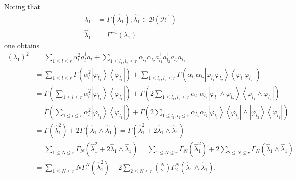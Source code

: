 \documentclass[aps,preprint]{revtex4}%
\begin{document}
Noting that
\begin{align}
\lambda_{1}  &  =\Gamma\left(  \hat{\lambda}_{1}\right)  ;\hat{\lambda}_{1}%
\in\mathcal{B}\left(  \mathcal{H}^{1}\right) \nonumber\\
\hat{\lambda}_{1}  &  =\Gamma^{-1}\left(  \lambda_{1}\right)
\end{align}
one obtains%
\begin{align}
\left(  \lambda_{1}\right)  ^{2}  &  =\sum_{1\leq l\leq r}\alpha_{l}^{2}%
a_{l}^{\dagger}a_{l}+\sum_{1\leq l_{1},l_{2}\leq r}\alpha_{l_{1}}\alpha
_{l_{2}}a_{l_{1}}^{\dagger}a_{l_{2}}^{\dagger}a_{l_{2}}a_{l_{1}}\nonumber\\
&  =\sum_{1\leq l\leq r}\Gamma\left(  \alpha_{l}^{2}\left\vert \varphi_{l_{1}%
}\right\rangle \left\langle \varphi_{l_{1}}\right\vert \right)  +\sum_{1\leq
l_{1},l_{2}\leq r}\Gamma\left(  \alpha_{l_{1}}\alpha_{l_{2}}\left\vert
\varphi_{l_{1}}\varphi_{l_{2}}\right\rangle \left\langle \varphi_{l_{1}%
}\varphi_{l_{2}}\right\vert \right) \nonumber\\
&  =\Gamma\left(  \sum_{1\leq l\leq r}\alpha_{l}^{2}\left\vert \varphi_{l_{1}%
}\right\rangle \left\langle \varphi_{l_{1}}\right\vert \right)  +\Gamma\left(
2\sum_{1\leq l_{1},l_{2}\leq r}\alpha_{l_{1}}\alpha_{l_{2}}\left\vert
\varphi_{l_{1}}\wedge\varphi_{l_{2}}\right\rangle \left\langle \varphi_{l_{1}%
}\wedge\varphi_{l_{2}}\right\vert \right) \nonumber\\
&  =\Gamma\left(  \sum_{1\leq l\leq r}\alpha_{l}^{2}\left\vert \varphi_{l_{1}%
}\right\rangle \left\langle \varphi_{l_{1}}\right\vert \right)  +\Gamma\left(
2\sum_{1\leq l_{1},l_{2}\leq r}\alpha_{l_{1}}\alpha_{l_{2}}\left\vert
\varphi_{l_{1}}\right\rangle \left\langle \varphi_{l_{1}}\right\vert
\wedge\left\vert \varphi_{l_{2}}\right\rangle \left\langle \varphi_{l_{2}%
}\right\vert \right) \nonumber\\
&  =\Gamma\left(  \hat{\lambda}_{1}^{2}\right)  +2\Gamma\left(  \hat{\lambda
}_{1}\wedge\hat{\lambda}_{1}\right)  =\Gamma\left(  \hat{\lambda}_{1}%
^{2}+2\hat{\lambda}_{1}\wedge\hat{\lambda}_{1}\right) \nonumber\\
&  =\sum_{1\leq N\leq r}\Gamma_{N}\left(  \hat{\lambda}_{1}^{2}+2\hat{\lambda
}_{1}\wedge\hat{\lambda}_{1}\right)  =\sum_{1\leq N\leq r}\Gamma_{N}\left(
\hat{\lambda}_{1}^{2}\right)  +2\sum_{2\leq N\leq r}\Gamma_{N}\left(
\hat{\lambda}_{1}\wedge\hat{\lambda}_{1}\right) \nonumber\\
&  =\sum_{1\leq N\leq r}N\Gamma_{1}^{N}\left(  \hat{\lambda}_{1}^{2}\right)
+2\sum_{2\leq N\leq r}\binom{N}{2}\Gamma_{2}^{N}\left(  \hat{\lambda}%
_{1}\wedge\hat{\lambda}_{1}\right)  ,
\end{align}
\end{document}
